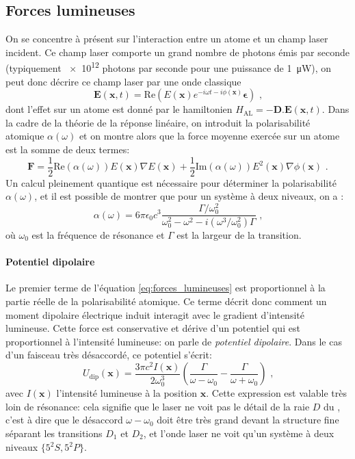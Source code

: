 \subsection{Forces lumineuses}
\label{sc:forces_lumineuses}
On se concentre à présent sur l'interaction entre un atome et un champ laser incident. Ce champ laser comporte un grand nombre de photons émis par seconde (typiquement \num{e12} photons par seconde pour une puissance de \SI{1}{\micro\watt}), on peut donc décrire ce champ laser par une onde classique 
\begin{equation}
\mathbf{E}(\mathbf{x},t)= \mathrm{Re} \left( E(\mathbf{x}) e^{-i \omega t - i\phi (\mathbf{x})}  \boldsymbol\epsilon \right) \text{ ,}
\end{equation}
dont l'effet sur un atome est donné par le hamiltonien $H_{\mathrm{AL}}=-\mathbf{D}.\mathbf{E}(\mathbf{x},t)$. 
Dans la cadre de la théorie de la réponse linéaire, on introduit la polarisabilité atomique $\alpha(\omega)$ et on montre alors que la force moyenne exercée sur un atome est la somme de deux termes:
\begin{equation}
\mathbf{F}=\frac{1}{2} \mathrm{Re}(\alpha(\omega)) E(\mathbf{x}) \nabla E(\mathbf{x})+\frac{1}{2}\mathrm{Im}(\alpha(\omega)) E^2(\mathbf{x}) \nabla \phi(\mathbf{x}) \text{ .}
\label{eq:forces_lumineuses}
\end{equation}
Un calcul pleinement quantique est nécessaire pour déterminer la polarisabilité $\alpha(\omega)$, et il est possible de montrer que pour un système à deux niveaux, on a \citep{grimm2000optical}:
\begin{equation}
\alpha(\omega)=6 \pi \epsilon_0 c^3 \frac{\Gamma / \omega_0^2}{\omega_0^2 -\omega^2 -i(\omega^3/\omega_0^2)\Gamma} \text{ ,}
\end{equation}
où $\omega_0$ est la fréquence de résonance et $\Gamma$ est la largeur de la transition.

\paragraph*{Potentiel dipolaire}
Le premier terme de l'équation \ref{eq:forces_lumineuses} est proportionnel à la partie réelle de la polarisabilité atomique. Ce terme décrit donc comment un moment dipolaire électrique induit interagit avec le gradient d'intensité lumineuse. Cette force est conservative et dérive d'un potentiel qui est proportionnel à l'intensité lumineuse: on parle de \emph{potentiel dipolaire}. Dans le cas d'un faisceau très désaccordé, ce potentiel s'écrit:
\begin{equation}
U_{\mathrm{dip}}(\mathbf{x})=\frac{3\pi c^2 I(\mathbf{x})}{2 \omega_0^3} \left( \frac{\Gamma}{\omega - \omega_0} - \frac{\Gamma}{\omega + \omega_0} \right) \text{ ,}
\label{eq:potentiel_dipolaire}
\end{equation}
avec $I(\mathbf{x})$ l'intensité lumineuse à la position $\mathbf{x}$. Cette expression est valable très loin de résonance: cela signifie que le laser ne voit pas le détail de la raie $D$ du , c'est à dire que le désaccord $\omega-\omega_0$ doit être très grand devant la structure fine séparant les transitions $D_1$ et $D_2$, et l'onde laser ne voit qu'un système à deux niveaux $\lbrace 5 {}^2S, 5 {}^2P \rbrace$.

